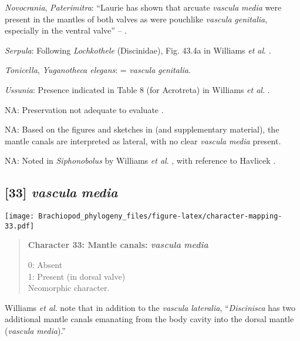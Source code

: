 \documentclass[openany]{book}
\theoremstyle{definition}
\theoremstyle{definition}
\theoremstyle{definition}
\theoremstyle{remark}
\begin{document}
\hypertarget{Novocrania-coding-32}{}
\emph{Novocrania}, \emph{Paterimitra}: ``Laurie
\citeyearpar{Laurie1987Themusculature} has shown that arcuate
\emph{vascula} \emph{media} were present in the mantles of both valves
as were pouchlike \emph{vascula} \emph{genitalia}, especially in the
ventral valve'' -- \citet{Williams1997Introduction}.

\hypertarget{Serpula-coding-32}{}
\emph{Serpula}: Following \emph{Lochkothele} (Discinidae), Fig. 43.4a in
Williams \emph{et al}.
\citeyearpar{Williams2000LinguliformeaCraniiformea}.

\hypertarget{Tonicella-coding-32}{}
\emph{Tonicella}, \emph{Yuganotheca elegans}: = \emph{vascula}
\emph{genitalia}.

\hypertarget{Ussunia-coding-32}{}
\emph{Ussunia}: Presence indicated in Table 8 (for Acrotreta) in
Williams \emph{et al}.
\citeyearpar{Williams2000LinguliformeaCraniiformea}.

\hypertarget{NA-coding-32}{}
NA: Preservation not adequate to evaluate \citep{Streng2016Anew}.

\hypertarget{NA-coding-32}{}
NA: Based on the figures and sketches in \citet{Zhang2014Anearly} (and
supplementary material), the mantle canals are interpreted as lateral,
with no clear \emph{vascula} \emph{media} present.

\hypertarget{NA-coding-32}{}
NA: Noted in \emph{Siphonobolus} by Williams \emph{et al}.
\citeyearpar{Williams2000LinguliformeaCraniiformea}, with reference to
Havlicek \citeyearpar{Havlicek1982LingulaceaPaterinacea}.

\subsection*{\texorpdfstring{{[}33{]} \emph{vascula}
\emph{media}}{{[}33{]} vascula media}}\label{vascula-media}

\texttt{[image: Brachiopod\_phylogeny\_files/figure-latex/character-mapping-33.pdf]}

\begin{quote}
\textbf{Character 33: Mantle canals: \emph{vascula} \emph{media}}

0: Absent\\
1: Present (in dorsal valve)\\
Neomorphic character.
\end{quote}

Williams \emph{et al}. \citeyearpar{Williams1997Introduction} note that
in addition to the \emph{vascula} \emph{lateralia}, ``\emph{Discinisca}
has two additional mantle canals emanating from the body cavity into the
dorsal mantle (\emph{vascula} \emph{media}).''
\end{document}
